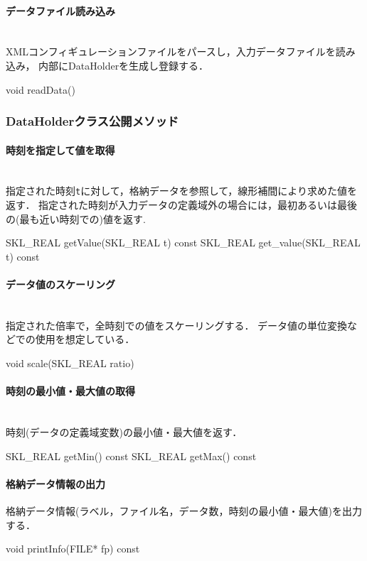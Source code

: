 \paragraph{データファイル読み込み}\mbox{}\\
XMLコンフィギュレーションファイルをパースし，入力データファイルを読み込み，
内部にDataHolderを生成し登録する．
{\small
\begin{program}
void readData()
\end{program}
}

\subsubsection{DataHolderクラス公開メソッド}
\paragraph{時刻を指定して値を取得}\mbox{}\\
指定された時刻{\tt t}に対して，格納データを参照して，線形補間により求めた値を返す．
指定された時刻が入力データの定義域外の場合には，最初あるいは最後の(最も近い時刻での)値を返す.
{\small
\begin{program}
SKL_REAL getValue(SKL_REAL t) const
SKL_REAL get_value(SKL_REAL t) const
\end{program}
}

\paragraph{データ値のスケーリング}\mbox{}\\
指定された倍率で，全時刻での値をスケーリングする．
データ値の単位変換などでの使用を想定している．
{\small
\begin{program}
void scale(SKL_REAL ratio)
\end{program}
}

\paragraph{時刻の最小値・最大値の取得}\mbox{}\\
時刻(データの定義域変数)の最小値・最大値を返す．
{\small
\begin{program}
SKL_REAL getMin() const
SKL_REAL getMax() const 
\end{program}
}

\paragraph{格納データ情報の出力}
格納データ情報(ラベル，ファイル名，データ数，時刻の最小値・最大値)を出力する．
{\small
\begin{program}
void printInfo(FILE* fp) const
\end{program}
}

